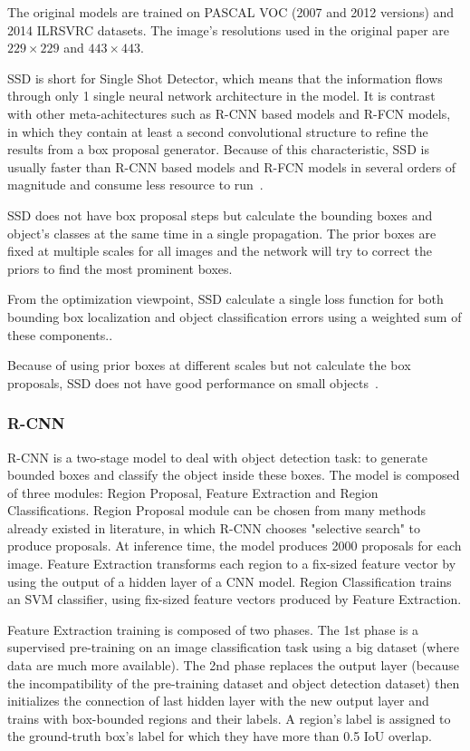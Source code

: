 \documentclass[conference]{IEEEtran}
\begin{document}
The original models are trained on PASCAL VOC (2007 and 2012 versions) and 2014 ILRSVRC datasets. The image's resolutions used in the original paper are $229 \times 229$ and $443 \times 443$.

SSD is short for Single Shot Detector, which means that the information flows through only 1 single neural network architecture in the model. It is contrast with other meta-achitectures such as R-CNN based models and R-FCN models, in which they contain at least a second convolutional structure to refine the results from a box proposal generator. Because of this characteristic, SSD is usually faster than R-CNN based models and R-FCN models in several orders of magnitude and consume less resource to run~\cite{huang2017speed}.

SSD does not have box proposal steps but calculate the bounding boxes and object's classes at the same time in a single propagation. The prior boxes are fixed at multiple scales for all images and the network will try to correct the priors to find the most prominent boxes.

From the optimization viewpoint, SSD calculate a single loss function for both bounding box localization and object classification errors using a weighted sum of these components.. 

Because of using prior boxes at different scales but not calculate the box proposals, SSD does not have good performance on small objects~\cite{liu2016ssd}.


\subsubsection{R-CNN }
R-CNN is a two-stage model to deal with object detection task: to generate bounded boxes and classify the object inside these boxes. The model is composed of three modules: Region Proposal, Feature Extraction and Region Classifications. Region Proposal module can be chosen from many methods already existed in literature, in which R-CNN chooses "selective search" to produce proposals. At inference time, the model produces 2000 proposals for each image. Feature Extraction transforms each region to a fix-sized feature vector by using the output of a hidden layer of a CNN model. Region Classification trains an SVM classifier, using fix-sized feature vectors produced by Feature Extraction.

Feature Extraction training is composed of two phases. The 1st phase is a supervised pre-training on an image classification task using a big dataset (where data are much more available). The 2nd phase replaces the output layer (because the incompatibility of the pre-training dataset and object detection dataset) then initializes the connection of last hidden layer with the new output layer and trains with box-bounded regions and their labels. A region's label is assigned to the ground-truth box's label for which they have more than 0.5 IoU overlap.
\end{document}
